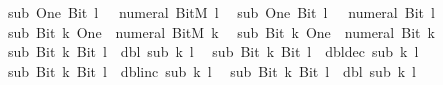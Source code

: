 \begin{isabellebody}
\ \ {\isachardoublequoteopen}sub\ One\ {\isacharparenleft}{\kern0pt}Bit{}\ l{\isacharparenright}{\kern0pt}\ {\isacharequal}{\kern0pt}\ {\isacharminus}{\kern0pt}\ numeral\ {\isacharparenleft}{\kern0pt}BitM\ l{\isacharparenright}{\kern0pt}{\isachardoublequoteclose}\isanewline
\ \ {\isachardoublequoteopen}sub\ One\ {\isacharparenleft}{\kern0pt}Bit{}\ l{\isacharparenright}{\kern0pt}\ {\isacharequal}{\kern0pt}\ {\isacharminus}{\kern0pt}\ numeral\ {\isacharparenleft}{\kern0pt}Bit{}\ l{\isacharparenright}{\kern0pt}{\isachardoublequoteclose}\isanewline
\ \ {\isachardoublequoteopen}sub\ {\isacharparenleft}{\kern0pt}Bit{}\ k{\isacharparenright}{\kern0pt}\ One\ {\isacharequal}{\kern0pt}\ numeral\ {\isacharparenleft}{\kern0pt}BitM\ k{\isacharparenright}{\kern0pt}{\isachardoublequoteclose}\isanewline
\ \ {\isachardoublequoteopen}sub\ {\isacharparenleft}{\kern0pt}Bit{}\ k{\isacharparenright}{\kern0pt}\ One\ {\isacharequal}{\kern0pt}\ numeral\ {\isacharparenleft}{\kern0pt}Bit{}\ k{\isacharparenright}{\kern0pt}{\isachardoublequoteclose}\isanewline
\ \ {\isachardoublequoteopen}sub\ {\isacharparenleft}{\kern0pt}Bit{}\ k{\isacharparenright}{\kern0pt}\ {\isacharparenleft}{\kern0pt}Bit{}\ l{\isacharparenright}{\kern0pt}\ {\isacharequal}{\kern0pt}\ dbl\ {\isacharparenleft}{\kern0pt}sub\ k\ l{\isacharparenright}{\kern0pt}{\isachardoublequoteclose}\isanewline
\ \ {\isachardoublequoteopen}sub\ {\isacharparenleft}{\kern0pt}Bit{}\ k{\isacharparenright}{\kern0pt}\ {\isacharparenleft}{\kern0pt}Bit{}\ l{\isacharparenright}{\kern0pt}\ {\isacharequal}{\kern0pt}\ dbl{\isacharunderscore}{\kern0pt}dec\ {\isacharparenleft}{\kern0pt}sub\ k\ l{\isacharparenright}{\kern0pt}{\isachardoublequoteclose}\isanewline
\ \ {\isachardoublequoteopen}sub\ {\isacharparenleft}{\kern0pt}Bit{}\ k{\isacharparenright}{\kern0pt}\ {\isacharparenleft}{\kern0pt}Bit{}\ l{\isacharparenright}{\kern0pt}\ {\isacharequal}{\kern0pt}\ dbl{\isacharunderscore}{\kern0pt}inc\ {\isacharparenleft}{\kern0pt}sub\ k\ l{\isacharparenright}{\kern0pt}{\isachardoublequoteclose}\isanewline
\ \ {\isachardoublequoteopen}sub\ {\isacharparenleft}{\kern0pt}Bit{}\ k{\isacharparenright}{\kern0pt}\ {\isacharparenleft}{\kern0pt}Bit{}\ l{\isacharparenright}{\kern0pt}\ {\isacharequal}{\kern0pt}\ dbl\ {\isacharparenleft}{\kern0pt}sub\ k\ l{\isacharparenright}{\kern0pt}{\isachardoublequoteclose}\isanewline
%
\isadelimproof
\ \ %
\endisadelimproof
%
\isatagproof
{}\isamarkupfalse%

\end{isabellebody}
